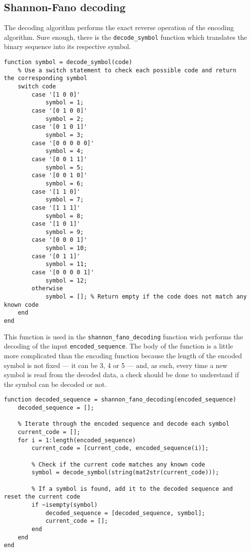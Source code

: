 \subsection{Shannon-Fano decoding}\label{source-decoding}
The decoding algorithm performs the exact reverse operation of the encoding algorithm. Sure enough, there is the \texttt{decode\_symbol} function which translates the binary sequence into its respective symbol.
\begin{lstlisting}
function symbol = decode_symbol(code)
    % Use a switch statement to check each possible code and return the corresponding symbol
    switch code
        case '[1 0 0]'
            symbol = 1;
        case '[0 1 0 0]'
            symbol = 2;
        case '[0 1 0 1]'
            symbol = 3;
        case '[0 0 0 0 0]'
            symbol = 4;
        case '[0 0 1 1]'
            symbol = 5;
        case '[0 0 1 0]'
            symbol = 6;
        case '[1 1 0]'
            symbol = 7;
        case '[1 1 1]'
            symbol = 8;
        case '[1 0 1]'
            symbol = 9;
        case '[0 0 0 1]'
            symbol = 10;
        case '[0 1 1]'
            symbol = 11;
        case '[0 0 0 0 1]'
            symbol = 12;
        otherwise
            symbol = []; % Return empty if the code does not match any known code
    end
end
\end{lstlisting}

\noindent This function is used in the \texttt{shannon\_fano\_decoding} function wich performs the decoding of the input \texttt{encoded\_sequence}. The body of the function is a little more complicated than the encoding function because the length of the encoded symbol is not fixed — it can be 3, 4 or 5 — and, as such, every time a new symbol is read from the decoded data, a check should be done to understand if the symbol can be decoded or not. 

\begin{lstlisting}
function decoded_sequence = shannon_fano_decoding(encoded_sequence)
    decoded_sequence = [];
    
    % Iterate through the encoded sequence and decode each symbol
    current_code = [];
    for i = 1:length(encoded_sequence)
        current_code = [current_code, encoded_sequence(i)];
        
        % Check if the current code matches any known code
        symbol = decode_symbol(string(mat2str(current_code)));
        
        % If a symbol is found, add it to the decoded sequence and reset the current code
        if ~isempty(symbol)
            decoded_sequence = [decoded_sequence, symbol];
            current_code = [];
        end
    end
end
\end{lstlisting}
